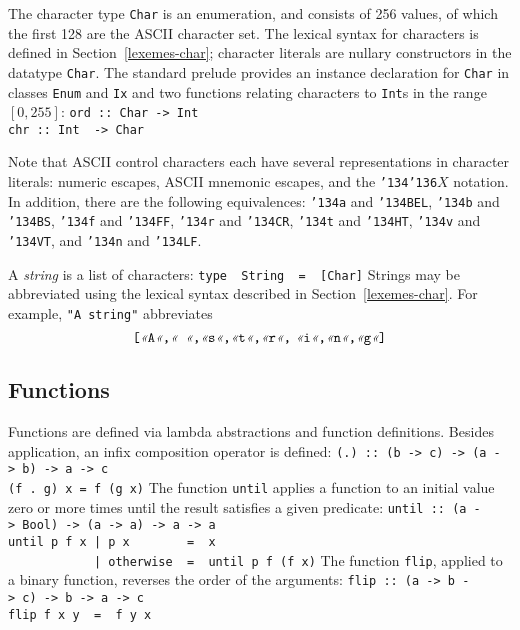 The character type \mbox{\tt Char}
is an enumeration, and consists of 256 values, of which the first 128
are the ASCII character set.  The lexical syntax for
characters is defined in Section~\ref{lexemes-char}; character
literals are nullary constructors in the datatype \mbox{\tt Char}.  The
standard prelude provides an instance declaration for \mbox{\tt Char} in classes
\mbox{\tt Enum} and \mbox{\tt Ix} and two functions relating characters to
\mbox{\tt Int}s in the range $[ 0 , 255 ]$:
\bprog
\mbox{\tt ord\ ::\ Char\ ->\ Int}\\
\mbox{\tt chr\ ::\ Int\ \ ->\ Char}
\eprogNoSkip{}

Note that ASCII control characters each have several representations
in character literals: numeric escapes, ASCII mnemonic escapes,
and the \mbox{\tt {\char'134}{\char'136}}$X$ notation.
In addition, there are the following equivalences:
\mbox{\tt {\char'134}a} and \mbox{\tt {\char'134}BEL}, \mbox{\tt {\char'134}b} and \mbox{\tt {\char'134}BS}, \mbox{\tt {\char'134}f} and \mbox{\tt {\char'134}FF}, \mbox{\tt {\char'134}r} and \mbox{\tt {\char'134}CR},
\mbox{\tt {\char'134}t} and \mbox{\tt {\char'134}HT}, \mbox{\tt {\char'134}v} and \mbox{\tt {\char'134}VT}, and \mbox{\tt {\char'134}n} and \mbox{\tt {\char'134}LF}.

A {\em string} is a list of characters:\nopagebreak[4]
\bprog
\mbox{\tt type\ \ String\ \ =\ \ [Char]}
\eprog{}
Strings may be abbreviated using the lexical syntax described in
Section~\ref{lexemes-char}.  For example, \mbox{\tt "A\ string"} abbreviates
\[
\mbox{\tt [}\fwq\mbox{\tt A}\fwq\mbox{\tt ,}\fwq\mbox{\tt \ }\fwq\mbox{\tt ,}\fwq\mbox{\tt s}\fwq\mbox{\tt ,}\fwq\mbox{\tt t}\fwq\mbox{\tt ,}\fwq\mbox{\tt r}\fwq\mbox{\tt ,} \
\fwq\mbox{\tt i}\fwq\mbox{\tt ,}\fwq\mbox{\tt n}\fwq\mbox{\tt ,}\fwq\mbox{\tt g}\fwq\mbox{\tt ]}
\]

\subsection{Functions}
\label{basic-functions}

Functions are defined via lambda abstractions and function
definitions.  Besides application, an infix composition operator is
defined:
\bprog
\mbox{\tt (.)\ ::\ (b\ ->\ c)\ ->\ (a\ ->\ b)\ ->\ a\ ->\ c}\\
\mbox{\tt (f\ .\ g)\ x\ =\ f\ (g\ x)}
\eprog{}
The function \mbox{\tt until} applies a
function to an initial value zero or more times until the result
satisfies a given predicate:
\bprog
\mbox{\tt until\ ::\ (a\ ->\ Bool)\ ->\ (a\ ->\ a)\ ->\ a\ ->\ a}\\
\mbox{\tt until\ p\ f\ x\ |\ p\ x\ \ \ \ \ \ \ \ =\ \ x}\\
\mbox{\tt \ \ \ \ \ \ \ \ \ \ \ \ |\ otherwise\ \ =\ \ until\ p\ f\ (f\ x)}
\eprog
The function \mbox{\tt flip}, applied to a binary function, reverses
the order of the arguments:
\bprog
\mbox{\tt flip\ ::\ (a\ ->\ b\ ->\ c)\ ->\ b\ ->\ a\ ->\ c}\\
\mbox{\tt flip\ f\ x\ y\ \ =\ \ f\ y\ x}
\eprogNoSkip

